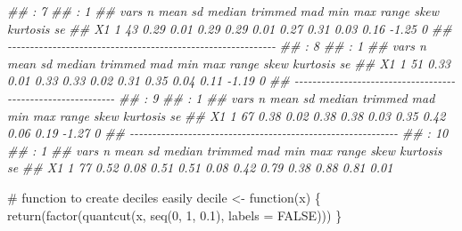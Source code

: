 \documentclass[
  10pt,
  a4paper,
]{book}
\newenvironment{Shaded}{\begin{snugshade}}{\end{snugshade}}
\newcommand{\AttributeTok}[1]{\textcolor[rgb]{0.40,0.45,0.13}{#1}}
\newcommand{\CommentTok}[1]{\textcolor[rgb]{0.37,0.37,0.37}{#1}}
\newcommand{\ConstantTok}[1]{\textcolor[rgb]{0.56,0.35,0.01}{#1}}
\newcommand{\ControlFlowTok}[1]{\textcolor[rgb]{0.00,0.46,0.62}{#1}}
\newcommand{\DecValTok}[1]{\textcolor[rgb]{0.68,0.00,0.00}{#1}}
\newcommand{\DocumentationTok}[1]{\textcolor[rgb]{0.37,0.37,0.37}{\textit{#1}}}
\newcommand{\FloatTok}[1]{\textcolor[rgb]{0.68,0.00,0.00}{#1}}
\newcommand{\FunctionTok}[1]{\textcolor[rgb]{0.28,0.35,0.67}{#1}}
\newcommand{\NormalTok}[1]{\textcolor[rgb]{0.00,0.46,0.62}{#1}}
\newcommand{\OtherTok}[1]{\textcolor[rgb]{0.00,0.46,0.62}{#1}}
\begin{document}
\begin{Shaded}
\begin{Highlighting}[]
\DocumentationTok{\#\# : 7}
\DocumentationTok{\#\# : 1}
\DocumentationTok{\#\#    vars  n mean   sd median trimmed  mad  min  max range skew kurtosis se}
\DocumentationTok{\#\# X1    1 43 0.29 0.01   0.29    0.29 0.01 0.27 0.31  0.03 0.16    {-}1.25  0}
\DocumentationTok{\#\# {-}{-}{-}{-}{-}{-}{-}{-}{-}{-}{-}{-}{-}{-}{-}{-}{-}{-}{-}{-}{-}{-}{-}{-}{-}{-}{-}{-}{-}{-}{-}{-}{-}{-}{-}{-}{-}{-}{-}{-}{-}{-}{-}{-}{-}{-}{-}{-}{-}{-}{-}{-}{-}{-}{-}{-}{-}{-}{-}{-} }
\DocumentationTok{\#\# : 8}
\DocumentationTok{\#\# : 1}
\DocumentationTok{\#\#    vars  n mean   sd median trimmed  mad  min  max range skew kurtosis se}
\DocumentationTok{\#\# X1    1 51 0.33 0.01   0.33    0.33 0.02 0.31 0.35  0.04 0.11    {-}1.19  0}
\DocumentationTok{\#\# {-}{-}{-}{-}{-}{-}{-}{-}{-}{-}{-}{-}{-}{-}{-}{-}{-}{-}{-}{-}{-}{-}{-}{-}{-}{-}{-}{-}{-}{-}{-}{-}{-}{-}{-}{-}{-}{-}{-}{-}{-}{-}{-}{-}{-}{-}{-}{-}{-}{-}{-}{-}{-}{-}{-}{-}{-}{-}{-}{-} }
\DocumentationTok{\#\# : 9}
\DocumentationTok{\#\# : 1}
\DocumentationTok{\#\#    vars  n mean   sd median trimmed  mad  min  max range skew kurtosis se}
\DocumentationTok{\#\# X1    1 67 0.38 0.02   0.38    0.38 0.03 0.35 0.42  0.06 0.19    {-}1.27  0}
\DocumentationTok{\#\# {-}{-}{-}{-}{-}{-}{-}{-}{-}{-}{-}{-}{-}{-}{-}{-}{-}{-}{-}{-}{-}{-}{-}{-}{-}{-}{-}{-}{-}{-}{-}{-}{-}{-}{-}{-}{-}{-}{-}{-}{-}{-}{-}{-}{-}{-}{-}{-}{-}{-}{-}{-}{-}{-}{-}{-}{-}{-}{-}{-} }
\DocumentationTok{\#\# : 10}
\DocumentationTok{\#\# : 1}
\DocumentationTok{\#\#    vars  n mean   sd median trimmed  mad  min  max range skew kurtosis   se}
\DocumentationTok{\#\# X1    1 77 0.52 0.08   0.51    0.51 0.08 0.42 0.79  0.38 0.88     0.81 0.01}

\CommentTok{\# function to create deciles easily}
\NormalTok{decile }\OtherTok{\textless{}{-}} \ControlFlowTok{function}\NormalTok{(x) \{}
  \FunctionTok{return}\NormalTok{(}\FunctionTok{factor}\NormalTok{(}\FunctionTok{quantcut}\NormalTok{(x, }\FunctionTok{seq}\NormalTok{(}\DecValTok{0}\NormalTok{, }\DecValTok{1}\NormalTok{, }\FloatTok{0.1}\NormalTok{), }\AttributeTok{labels =} \ConstantTok{FALSE}\NormalTok{)))}
\NormalTok{\}}


\end{Highlighting}
\end{Shaded}
\end{document}
